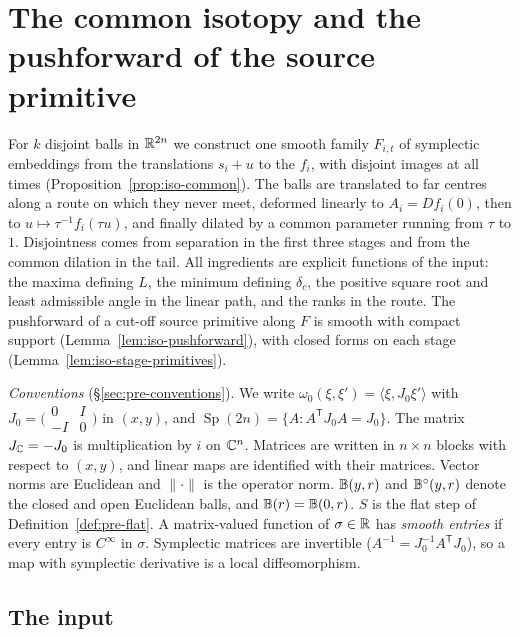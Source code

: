 \section{The common isotopy and the pushforward of the source primitive}\label{sec:iso}

For $k$ disjoint balls in $\mathbb{R}^{2n}$ we construct one smooth family $F_{i,t}$ of symplectic embeddings from the translations $s_i+u$ to the $f_i$, with disjoint images at all times (Proposition~\ref{prop:iso-common}). The balls are translated to far centres along a route on which they never meet, deformed linearly to $A_i=Df_i(0)$, then to $u\mapsto\tau^{-1}f_i(\tau u)$, and finally dilated by a common parameter running from $\tau$ to $1$. Disjointness comes from separation in the first three stages and from the common dilation in the tail. All ingredients are explicit functions of the input: the maxima defining $L$, the minimum defining $\delta_c$, the positive square root and least admissible angle in the linear path, and the ranks in the route. The pushforward of a cut-off source primitive along $F$ is smooth with compact support (Lemma~\ref{lem:iso-pushforward}), with closed forms on each stage (Lemma~\ref{lem:iso-stage-primitives}).

\emph{Conventions} (\S\ref{sec:pre-conventions}). We write $\omega_0(\xi,\xi')=\langle\xi,J_0\xi'\rangle$ with $J_0=\bigl(\begin{smallmatrix}0&I\\-I&0\end{smallmatrix}\bigr)$ in $(x,y)$, and $\operatorname{Sp}(2n)=\{A:A^{\mathsf T}J_0A=J_0\}$. The matrix $J_{\mathbb{C}}=-J_0$ is multiplication by $i$ on $\mathbb{C}^n$. Matrices are written in $n\times n$ blocks with respect to $(x,y)$, and linear maps are identified with their matrices. Vector norms are Euclidean and $\|\cdot\|$ is the operator norm. $\mathbb{B}(y,r)$ and $\mathbb{B}^\circ(y,r)$ denote the closed and open Euclidean balls, and $\mathbb{B}(r)=\mathbb{B}(0,r)$. $S$ is the flat step of Definition~\ref{def:pre-flat}. A matrix-valued function of $\sigma\in\mathbb{R}$ has \emph{smooth entries} if every entry is $C^\infty$ in $\sigma$. Symplectic matrices are invertible ($A^{-1}=J_0^{-1}A^{\mathsf T}J_0$), so a map with symplectic derivative is a local diffeomorphism.

\subsection{The input}\label{sec:iso-input}

